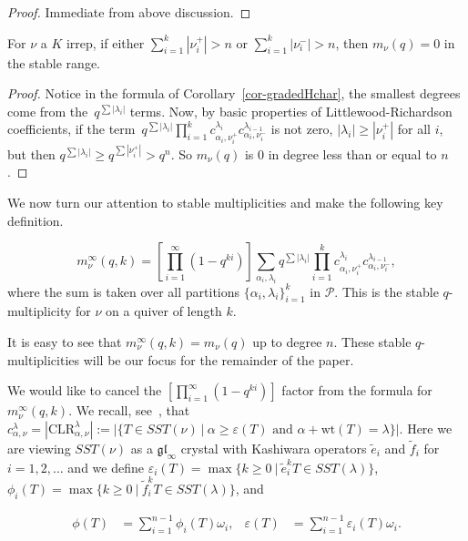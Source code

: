 \documentclass[11pt]{article}
\theoremstyle{definition}
\numberwithin{equation}{section}
\newcommand{\gl}{\mathfrak{gl}}
\newcommand{\Par}{\mathcal{P}}
\newcommand{\wt}{\text{wt}}
\newcommand{\CLR}{\text{CLR}}
\begin{document}
\begin{proof}
    Immediate from above discussion.
\end{proof}

\begin{cor}
    For $\nu$ a $K$ irrep, if either $\sum_{i=1}^k |\nu_i^+| > n$ or $\sum_{i=1}^k |\nu_i^-| > n$, then $m_\nu(q) = 0$ in the stable range.
\end{cor}

\begin{proof}
    Notice in the formula of Corollary~\ref{cor-gradedHchar}, the smallest degrees come from the~$q^{\sum |\lambda_i|}$ terms. Now, by basic properties of Littlewood-Richardson coefficients, if the term~$q^{\sum |\lambda_i|}\prod_{i=1}^k
    c^{\lambda_i}_{\alpha_i, \nu_i^+} c^{\lambda_{i-1}}_{\alpha_i, \nu_i^-}$ is not zero, $|\lambda_i| \geq |\nu_i^+|$ for all $i$, but then $q^{\sum |\lambda_i|} \geq q^{\sum |\nu_i^+|} > q^{n}$. So $m_\nu(q)$ is 0 in degree less than or equal to $n$.
\end{proof}

We now turn our attention to stable multiplicities and make the following key definition.
\begin{defn}
    $$m_\nu^\infty(q,k) = [\prod_{i=1}^\infty(1-q^{ki})]\sum_{\alpha_i, \lambda_i} q^{\sum |\lambda_i|}\prod_{i=1}^k
    c^{\lambda_i}_{\alpha_i, \nu_i^+} c^{\lambda_{i-1}}_{\alpha_i, \nu_i^-},$$
    where the sum is taken over all partitions $\{\alpha_i, \lambda_i\}_{i=1}^k$ in $\Par$. This is the stable $q$-multiplicity for $\nu$ on a quiver of length $k$.
\end{defn}

It is easy to see that $m_\nu^\infty(q,k) = m_\nu(q)$ up to degree $n$. These stable $q$-multiplicities will be our focus for the remainder of the paper.

We would like to cancel the $[\prod_{i=1}^\infty(1-q^{ki})]$ factor from the formula for $m_\nu^\infty(q,k)$. We recall, see~\cite{frohmader2023graded}, that $c^{\lambda}_{\alpha, \nu} = |\CLR^\lambda_{\alpha, \nu}| := |\{T \in SST(\nu) \ | \ \alpha \geq \varepsilon(T) \text{ and } \alpha + \wt(T) = \lambda \}|$. Here we are viewing $SST(\nu)$ as a $\gl_\infty$ crystal with Kashiwara operators $\tilde{e}_i$ and $\tilde{f}_i$ for~$i = 1, 2, \dots $ and we define $\varepsilon_i(T) = \max \{ k \geq 0 \ | \ \tilde{e}_i^k T \in SST(\lambda) \}$, $\phi_i(T) = \max \{ k \geq 0 \ | \ \tilde{f}_i^k T \in SST(\lambda) \}$, and 

\begin{align*}
\phi(T) &= \sum_{i=1}^{n-1}\phi_i(T)\omega_i,   &   \varepsilon(T) &= \sum_{i=1}^{n-1}\varepsilon_i(T)\omega_i.    
\end{align*}
\end{document}
